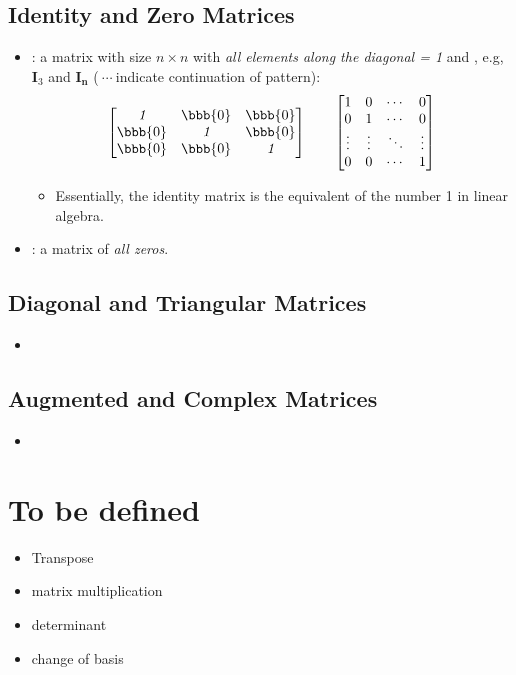 \begin{itemize}
  \subsection{Identity and Zero Matrices}\label{Identity and Zero Matrices}
  \begin{itemize}
    \item {}: a matrix with size \(n \times n\) with \emph{all elements along the diagonal = 1} and , e.g, \(\bm{I}_3\) and \(\bm{I_n}\) (\(~\cdots~\)indicate continuation of pattern):
    \[%
    \begin{bmatrix}
    \emph{1} & \bbb{0} & \bbb{0} \\
    \bbb{0} & \emph{1} & \bbb{0} \\
    \bbb{0} & \bbb{0} & \emph{1} 
    \end{bmatrix}
    \qquad
    \begin{bmatrix}
    1 & 0 & \cdots & 0 \\
    0 & 1 & \cdots & 0 \\
    \vdots & \vdots & \ddots & \vdots \\
    0 & 0 & \cdots & 1
    \end{bmatrix}
    \]%
    \begin{itemize}
      \item Essentially, the identity matrix is the equivalent of the number 1 in linear algebra. 
    \end{itemize}
    \item {}: a matrix of \emph{all zeros}.
  \end{itemize}
  
  \subsection{Diagonal and Triangular Matrices}\label{Diagonal and Triagnular Matrices}
  \begin{itemize}
    \item 
  \end{itemize}
  
  \subsection{Augmented and Complex Matrices}\label{Augmented and Complex Matrices}
  \begin{itemize}
    \item 
  \end{itemize}
  
\end{itemize}



\newpage

\section{To be defined}\label{tbd}
\begin{itemize}
  \item Transpose
  \item matrix multiplication
  \item determinant
  \item change of basis
\end{itemize}